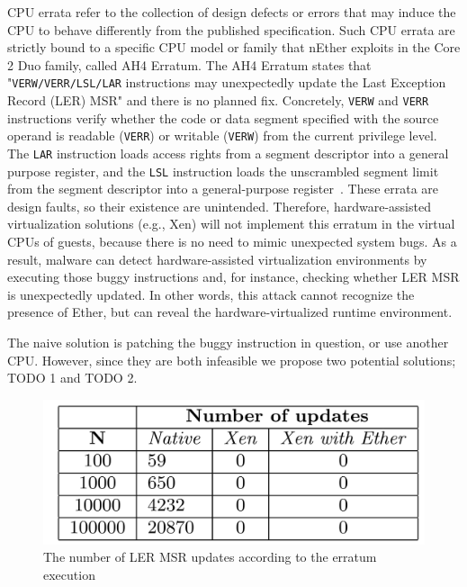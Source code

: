 CPU errata refer to the collection of design defects or errors that may induce
the CPU to behave differently from the published specification. Such CPU errata
are strictly bound to a specific CPU model or family that nEther exploits in the
Core 2 Duo family, called AH4 Erratum. The AH4 Erratum states that
"\texttt{VERW/VERR/LSL/LAR} instructions may unexpectedly update the Last
Exception Record (LER) MSR" and there is no planned fix. Concretely,
\texttt{VERW} and \texttt{VERR} instructions verify whether the code or data
segment specified with the source operand is readable (\texttt{VERR}) or
writable (\texttt{VERW}) from the current privilege level. The \texttt{LAR}
instruction loads access rights from a segment descriptor into a general purpose
register, and the \texttt{LSL} instruction loads the unscrambled segment limit
from the segment descriptor into a general-purpose register~\cite{intelsys}.
These errata are design faults, so their existence are unintended. Therefore,
hardware-assisted virtualization solutions (e.g., Xen) will not implement this
erratum in the virtual CPUs of guests, because there is no need to mimic
unexpected system bugs. As a result, malware can detect hardware-assisted
virtualization environments by executing those buggy instructions and, for
instance, checking whether LER MSR is unexpectedly updated. In other words, this
attack cannot recognize the presence of Ether, but can reveal the
hardware-virtualized runtime environment.

The naive solution is patching the buggy instruction in question, or use another
CPU. However, since they are both infeasible we propose two potential solutions;
TODO 1 and TODO 2. 

\begin{figure}[!h]
	\centering
	\includegraphics[width=\linewidth]{figure/errata_table.png}
	\caption{The number of LER MSR updates according to the erratum execution}
	\label{fig:errata}
\end{figure}

